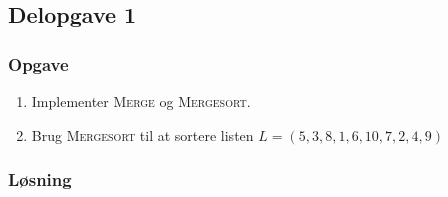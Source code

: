 \subsection{Delopgave 1}
\subsubsection{Opgave}
\begin{enumerate}
	\item Implementer \textsc{Merge} og \textsc{Mergesort}. 
	\item Brug \textsc{Mergesort} til at sortere listen $L=(5,3,8,1,6,10,7,2,4,9)$
\end{enumerate}

\subsubsection{Løsning}
